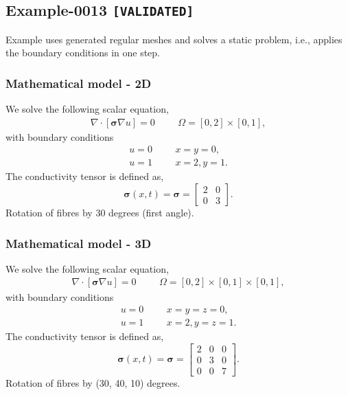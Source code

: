 %
\clearpage
%
\subsection{Example-0013 \texttt{[VALIDATED]}}
%
Example uses generated regular meshes and solves a static problem, i.e., applies
the boundary conditions in one step.
%
%
\subsubsection{Mathematical model - 2D}
%
We solve the following scalar equation,
%
\begin{align}
    \nabla \cdot [\boldsymbol{\sigma} \nabla u] = 0 & &&\Omega = [0, 2] \times [0, 1],
\end{align}
%
with boundary conditions
%
\begin{align}
    u = 0 & &&x = y = 0, \\
    u = 1 & &&x = 2, y = 1.
\end{align}
%
The conductivity tensor is defined as,
%
\begin{equation}
    \boldsymbol{\sigma} (x, t) = \boldsymbol{\sigma} = \begin{bmatrix} 2 & 0 \\ 0 & 3 \end{bmatrix}.
\end{equation}
%
Rotation of fibres by 30 degrees (first angle).
%
%
\subsubsection{Mathematical model - 3D}
%
We solve the following scalar equation,
%
\begin{align}
    \nabla \cdot [\boldsymbol{\sigma} \nabla u] = 0 & &&\Omega = [0, 2] \times [0, 1] \times [0, 1],
\end{align}
%
with boundary conditions
%
\begin{align}
    u = 0 & &&x = y = z = 0, \\
    u = 1 & &&x = 2, y = z = 1.
\end{align}
%
The conductivity tensor is defined as,
%
\begin{equation}
    \boldsymbol{\sigma} (x, t) = \boldsymbol{\sigma} = \begin{bmatrix} 2 & 0 & 0 \\ 0 & 3 & 0 \\ 0 & 0 & 7 \end{bmatrix}.
\end{equation}
%
Rotation of fibres by (30, 40, 10) degrees.
%
%
